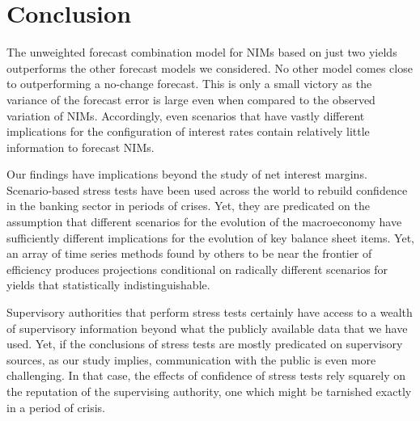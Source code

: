 \documentclass[11pt]{article}
\renewcommand{\baselinestretch}{1.5}
\begin{document}
\section{Conclusion}

The unweighted forecast combination model for NIMs based on just two yields outperforms the other forecast models we considered. No other model comes close to outperforming a no-change forecast.  This is only a small victory as the variance of the forecast error is large even when compared to the observed variation of NIMs. Accordingly, even scenarios that have vastly different implications for the configuration of interest rates contain relatively little information to forecast NIMs.

Our findings have implications beyond the study of net interest margins. Scenario-based stress tests have been used across the world to rebuild confidence in the banking sector in periods of crises. Yet, they are predicated on the assumption that different scenarios for the evolution of the macroeconomy have sufficiently different implications for the evolution of key balance sheet items.  Yet, an array of time series methods found by others to be near the frontier of efficiency produces projections conditional on radically different scenarios for yields that statistically indistinguishable. 

Supervisory authorities that perform stress tests certainly have access to a wealth of supervisory information beyond what  the publicly available data that we have used. Yet, if the conclusions of stress tests are mostly predicated on supervisory sources, as our study implies, communication with the public is even more challenging. In that case, the effects of confidence of stress tests rely squarely on the reputation of the supervising authority, one which might be tarnished exactly in a period of crisis.

\normalsize \clearpage
\renewcommand{\baselinestretch}{1} 







\renewcommand{\baselinestretch}{1.5}
\end{document}
